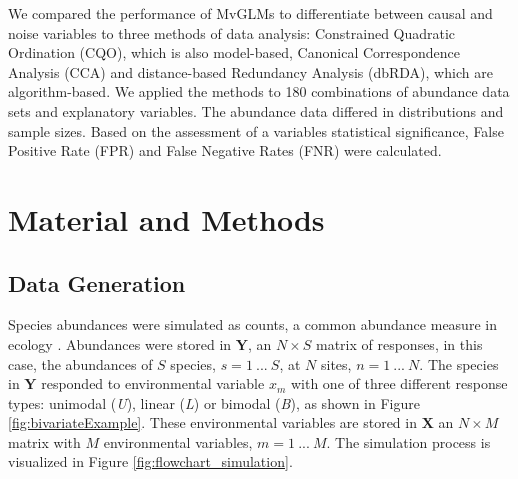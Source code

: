 \documentclass[a4paper,11pt]{article}
\begin{document}
	
	We compared the performance of MvGLMs to differentiate between causal and noise variables to three methods of data analysis: 
	Constrained Quadratic Ordination (CQO), which is also model-based, Canonical Correspondence Analysis (CCA) and distance-based Redundancy Analysis (dbRDA), which are algorithm-based.
	We applied the methods to 180 combinations of abundance data sets and explanatory variables.
	The abundance data differed in distributions and sample sizes. 
    Based on the assessment of a variables statistical significance, False Positive Rate (FPR) and False Negative Rates (FNR) were calculated. 
\section{Material and Methods}


	\subsection*{Data Generation}
		Species abundances were simulated as counts, a common abundance measure in ecology \citep{Warton2008}. 
		Abundances were stored in $\mathbf{Y}$, an $N \times S$ matrix of responses, in this case, the abundances of $S$ species, $ s= 1\ ...\ S$, at $N$ sites, $ n = 1\ ...\ N$.
		The species in $\mathbf{Y}$ responded to  environmental variable $x_m$ with one of three different response types: unimodal (\textit{U}), linear (\textit{L}) or bimodal (\textit{B}), as shown in Figure \ref{fig:bivariateExample}.
		These environmental variables are stored in $\mathbf{X}$ an $N \times M$ matrix with $M$ environmental variables, $m = 1\ ... \ M$. 
	    The simulation process is visualized in Figure \ref{fig:flowchart_simulation}. 
\end{document}
